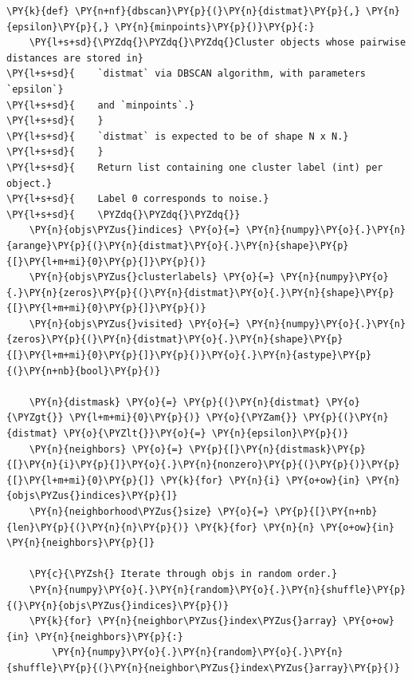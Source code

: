 \begin{listing}
\begin{Verbatim}[fontsize=\tiny,commandchars=\\\{\}]
\PY{k}{def} \PY{n+nf}{dbscan}\PY{p}{(}\PY{n}{distmat}\PY{p}{,} \PY{n}{epsilon}\PY{p}{,} \PY{n}{minpoints}\PY{p}{)}\PY{p}{:}
    \PY{l+s+sd}{\PYZdq{}\PYZdq{}\PYZdq{}Cluster objects whose pairwise distances are stored in}
\PY{l+s+sd}{    `distmat` via DBSCAN algorithm, with parameters `epsilon`}
\PY{l+s+sd}{    and `minpoints`.}
\PY{l+s+sd}{    }
\PY{l+s+sd}{    `distmat` is expected to be of shape N x N.}
\PY{l+s+sd}{    }
\PY{l+s+sd}{    Return list containing one cluster label (int) per object.}
\PY{l+s+sd}{    Label 0 corresponds to noise.}
\PY{l+s+sd}{    \PYZdq{}\PYZdq{}\PYZdq{}}
    \PY{n}{objs\PYZus{}indices} \PY{o}{=} \PY{n}{numpy}\PY{o}{.}\PY{n}{arange}\PY{p}{(}\PY{n}{distmat}\PY{o}{.}\PY{n}{shape}\PY{p}{[}\PY{l+m+mi}{0}\PY{p}{]}\PY{p}{)}
    \PY{n}{objs\PYZus{}clusterlabels} \PY{o}{=} \PY{n}{numpy}\PY{o}{.}\PY{n}{zeros}\PY{p}{(}\PY{n}{distmat}\PY{o}{.}\PY{n}{shape}\PY{p}{[}\PY{l+m+mi}{0}\PY{p}{]}\PY{p}{)}
    \PY{n}{objs\PYZus{}visited} \PY{o}{=} \PY{n}{numpy}\PY{o}{.}\PY{n}{zeros}\PY{p}{(}\PY{n}{distmat}\PY{o}{.}\PY{n}{shape}\PY{p}{[}\PY{l+m+mi}{0}\PY{p}{]}\PY{p}{)}\PY{o}{.}\PY{n}{astype}\PY{p}{(}\PY{n+nb}{bool}\PY{p}{)}

    \PY{n}{distmask} \PY{o}{=} \PY{p}{(}\PY{n}{distmat} \PY{o}{\PYZgt{}} \PY{l+m+mi}{0}\PY{p}{)} \PY{o}{\PYZam{}} \PY{p}{(}\PY{n}{distmat} \PY{o}{\PYZlt{}}\PY{o}{=} \PY{n}{epsilon}\PY{p}{)}
    \PY{n}{neighbors} \PY{o}{=} \PY{p}{[}\PY{n}{distmask}\PY{p}{[}\PY{n}{i}\PY{p}{]}\PY{o}{.}\PY{n}{nonzero}\PY{p}{(}\PY{p}{)}\PY{p}{[}\PY{l+m+mi}{0}\PY{p}{]} \PY{k}{for} \PY{n}{i} \PY{o+ow}{in} \PY{n}{objs\PYZus{}indices}\PY{p}{]}
    \PY{n}{neighborhood\PYZus{}size} \PY{o}{=} \PY{p}{[}\PY{n+nb}{len}\PY{p}{(}\PY{n}{n}\PY{p}{)} \PY{k}{for} \PY{n}{n} \PY{o+ow}{in} \PY{n}{neighbors}\PY{p}{]}

    \PY{c}{\PYZsh{} Iterate through objs in random order.}
    \PY{n}{numpy}\PY{o}{.}\PY{n}{random}\PY{o}{.}\PY{n}{shuffle}\PY{p}{(}\PY{n}{objs\PYZus{}indices}\PY{p}{)}
    \PY{k}{for} \PY{n}{neighbor\PYZus{}index\PYZus{}array} \PY{o+ow}{in} \PY{n}{neighbors}\PY{p}{:}
        \PY{n}{numpy}\PY{o}{.}\PY{n}{random}\PY{o}{.}\PY{n}{shuffle}\PY{p}{(}\PY{n}{neighbor\PYZus{}index\PYZus{}array}\PY{p}{)}


\end{Verbatim}
\end{listing}
